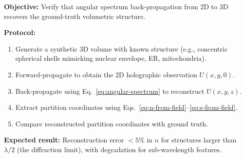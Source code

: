 \documentclass[11pt,twocolumn,a4paper]{article}
\begin{document}
\textbf{Objective:} Verify that angular spectrum back-propagation from
2D to 3D recovers the ground-truth volumetric structure.

\textbf{Protocol:}
\begin{enumerate}[label=(\roman*),leftmargin=*]
\item Generate a synthetic 3D volume with known structure (e.g.,
  concentric spherical shells mimicking nuclear envelope, ER,
  mitochondria).
\item Forward-propagate to obtain the 2D holographic observation
  $U(x,y,0)$.
\item Back-propagate using Eq.~\eqref{eq:angular-spectrum} to
  reconstruct $U(x,y,z)$.
\item Extract partition coordinates using
  Eqs.~\eqref{eq:n-from-field}--\eqref{eq:s-from-field}.
\item Compare reconstructed partition coordinates with ground truth.
\end{enumerate}

\textbf{Expected result:} Reconstruction error $< 5\%$ in $n$ for
structures larger than $\lambda/2$ (the diffraction limit), with
degradation for sub-wavelength features.
\end{document}

